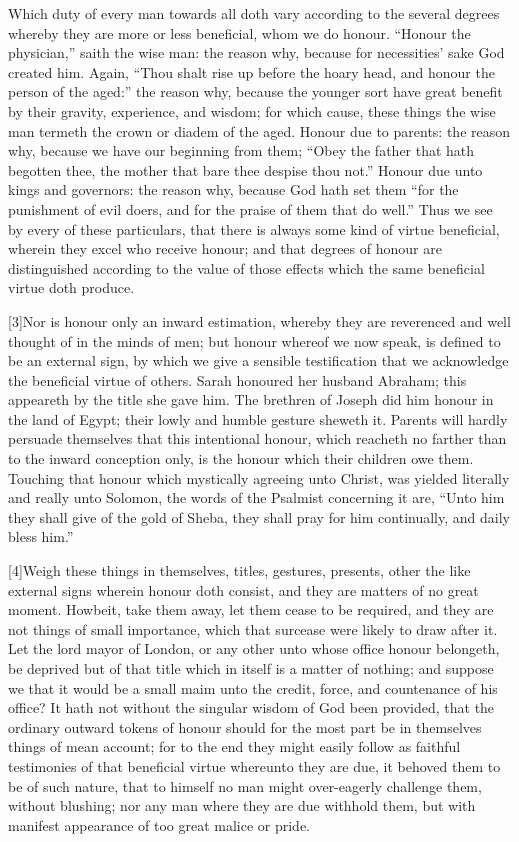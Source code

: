 Which duty of every man towards all doth vary according to the several degrees whereby they are more or less beneficial, whom we do honour. “Honour the physician,” saith the wise man: the reason why, because for necessities’ sake God created him. Again, “Thou shalt rise up before the hoary head, and honour the person of the aged:” the reason why, because the younger sort have great benefit by their gravity, experience, and wisdom; for which cause,  these things the wise man termeth the crown or diadem of the aged. Honour due to parents: the reason why, because we have our beginning from them; “Obey the father that hath begotten thee, the mother that bare thee despise thou not.” Honour due unto kings and governors: the reason why, because God hath set them “for the punishment of evil doers, and for the praise of them that do well.” Thus we see by every of these particulars, that there is always some kind of virtue beneficial, wherein they excel who receive honour; and that degrees of honour are distinguished according to the value of those effects which the same beneficial virtue doth produce.

[3]Nor is honour only an inward estimation, whereby they are reverenced and well thought of in the minds of men; but honour whereof we now speak, is defined to be an external sign, by which we give a sensible testification that we acknowledge the beneficial virtue of others. Sarah honoured her husband Abraham; this appeareth by the title she gave him. The brethren of Joseph did him honour in the land of Egypt; their lowly and humble gesture sheweth it. Parents will hardly persuade themselves that this intentional honour, which reacheth no farther than to the inward conception only, is the honour which their children owe them. Touching that honour which mystically agreeing unto Christ, was yielded literally and really unto Solomon, the words of the Psalmist concerning it are, “Unto him they shall give of the gold of Sheba, they shall pray for him continually, and daily bless him.”

[4]Weigh these things in themselves, titles, gestures, presents, other the like external signs wherein honour doth consist, and they are matters of no great moment. Howbeit, take them away, let them cease to be required, and they are not things of small importance, which that surcease were likely to draw after it. Let the lord mayor of London, or any other unto whose office honour belongeth, be deprived but of that title which in itself is a matter of nothing; and suppose we that it would be a small maim unto the credit, force, and countenance of his office? It hath not without the  singular wisdom of God been provided, that the ordinary outward tokens of honour should for the most part be in themselves things of mean account; for to the end they might easily follow as faithful testimonies of that beneficial virtue whereunto they are due, it behoved them to be of such nature, that to himself no man might over-eagerly challenge them, without blushing; nor any man where they are due withhold them, but with manifest appearance of too great malice or pride.

